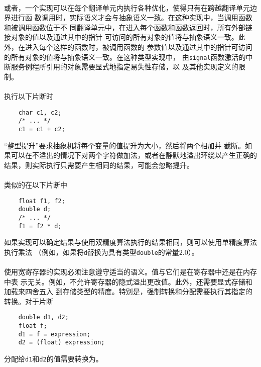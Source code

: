 \paragraph{}
或者，一个实现可以在每个翻译单元内执行各种优化，使得只有在跨越翻译单元边界进行函
数调用时，实际语义才会与抽象语义一致。在这种实现中，当调用函数和被调用函数位于不
同翻译单元中，在进入每个函数和函数返回时，所有外部链接对象的值以及通过其中的指针
可访问的所有对象的值将与抽象语义一致。此外，在进入每个这样的函数时，被调用函数的
参数值以及通过其中的指针可访问的所有对象的值将与抽象语义一致。在这种类型实现中，
由\texttt{signal}函数激活的中断服务例程所引用的对象需要显式地指定易失性存储，以
及其他实现定义的限制。

\paragraph{}
\ex 执行以下片断时
\begin{lstlisting}
    char c1, c2;
    /* ... */
    c1 = c1 + c2;
\end{lstlisting}
``整型提升''要求抽象机将每个变量的值提升为大小，然后将两个相加并
截断。如果可以在不溢出的情况下对两个字符做加法，或者在静默地溢出环绕以产生正确的
结果，则实际执行只需要产生相同的结果，可能会忽略提升。

\paragraph{}
\ex 类似的在以下片断中
\begin{lstlisting}
    float f1, f2;
    double d;
    /* ... */
    f1 = f2 * d;
\end{lstlisting}
如果实现可以确定结果与使用双精度算法执行的结果相同，则可以使用单精度算法执行乘法
（例如，如果将\texttt{d}替换为具有类型\texttt{double}的常量$2.0$）。

\paragraph{}
\ex 使用宽寄存器的实现必须注意遵守适当的语义。值与它们是在寄存器中还是在内存中表
示无关。例如，不允许寄存器的隐式溢出更改值。此外，还需要显式存储和加载来四舍五入
到存储类型的精度。特别是，强制转换和分配需要执行其指定的转换。对于片断
\begin{lstlisting}
    double d1, d2;
    float f;
    d1 = f = expression;
    d2 = (float) expression;
\end{lstlisting}
分配给\texttt{d1}和\texttt{d2}的值需要转换为。


